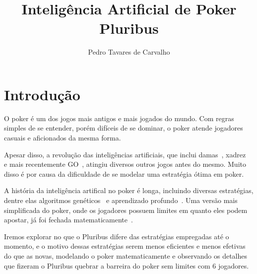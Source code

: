 \documentclass[twocolumn]{article}
\title{Inteligência Artificial de Poker\\Pluribus}
\author{Pedro Tavares de Carvalho}
\theoremstyle{mytheoremstyle}
\theoremstyle{mytheoremstyle}
\theoremstyle{myproblemstyle}
\begin{document}
    \begin{titlepage}
        \maketitle

        \vspace{3cm}

    \end{titlepage}

    \section{Introdução} %
    \label{sec:Introdução}
        O poker é um dos jogos mais antigos e mais jogados do mundo. Com regras simples de se entender, porém
        difíceis de se dominar, o poker atende jogadores casuais e aficionados da mesma forma.

        Apesar disso, a revolução das inteligências artificiais, que inclui damas~\cite{5392560}, xadrez~\cite{CAMPBELL200257}
        e mais recentemente GO~\cite{Silver2016}, atingiu diversos outros jogos antes do mesmo. Muito disso é por causa
        da dificuldade de se modelar uma estratégia ótima em poker.

        A história da inteligência artifical no poker é longa, incluindo diversas estratégias, dentre elas algoritmos genéticos~\cite{4219032} e
        aprendizado profundo~\cite{DBLP:journals/corr/MoravcikSBLMBDW17}. Uma versão mais simplificada do poker, onde os jogadores possuem
        limites em quanto eles podem apostar, já foi fechada matematicamente~\cite{bowling2015heads}.

        Iremos explorar no que o Pluribus difere das estratégias empregadas até o momento, e o motivo dessas estratégias serem menos eficientes
        e menos efetivas do que as novas, modelando o poker matematicamente e observando os detalhes que fizeram o Pluribus quebrar a barreira
        do poker sem limites com 6 jogadores.

\end{document}
